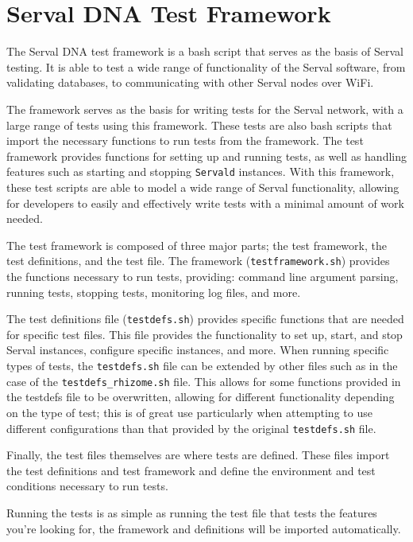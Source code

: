 \section{Serval DNA Test Framework}
The Serval DNA test framework is a bash script that serves as the basis of Serval testing.
It is able to test a wide range of functionality of the Serval software, from validating databases, to communicating with other Serval nodes over WiFi.

The framework serves as the basis for writing tests for the Serval network, with a large range of tests using this framework.
These tests are also bash scripts that import the necessary functions to run tests from the framework. 
The test framework provides functions for setting up and running tests, as well as handling features such as starting and stopping \texttt{Servald} instances.
With this framework, these test scripts are able to model a wide range of Serval functionality, allowing for developers to easily and effectively write tests with a minimal amount of work needed.

The test framework is composed of three major parts; the test framework, the test definitions, and the test file.
The framework (\texttt{testframework.sh}) provides the functions necessary to run tests, providing: command line argument parsing, running tests, stopping tests, monitoring log files, and more. 

The test definitions file (\texttt{testdefs.sh}) provides specific functions that are needed for specific test files.
This file provides the functionality to set up, start, and stop Serval instances, configure specific instances, and more.
When running specific types of tests, the \texttt{testdefs.sh} file can be extended by other files such as in the case of the \texttt{testdefs\_rhizome.sh} file. 
This allows for some functions provided in the testdefs file to be overwritten, allowing for different functionality depending on the type of test; this is of great use particularly when attempting to use different configurations than that provided by the original \texttt{testdefs.sh} file.

Finally, the test files themselves are where tests are defined. 
These files import the test definitions and test framework and define the environment and test conditions necessary to run tests. 

Running the tests is as simple as running the test file that tests the features you're looking for, the framework and definitions will be imported automatically.

